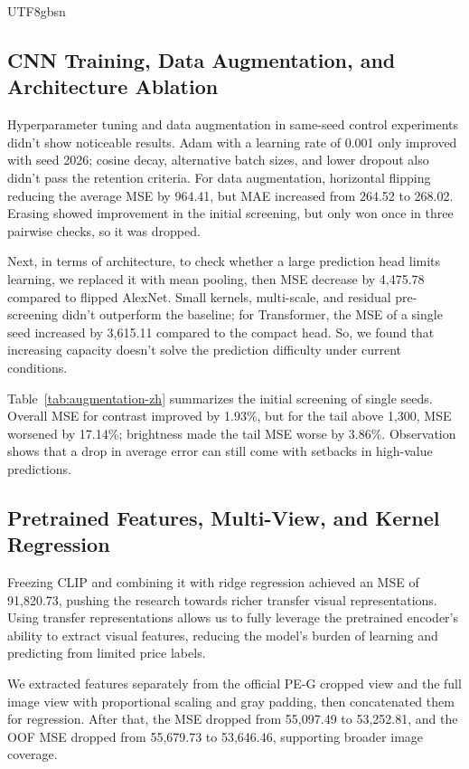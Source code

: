 \documentclass[conference,a4paper]{IEEEtran}
\begin{document}
\begin{CJK*}{UTF8}{gbsn}
\subsection{CNN Training, Data Augmentation, and Architecture Ablation}

Hyperparameter tuning and data augmentation in same-seed control experiments didn't show noticeable results. Adam with a learning rate of 0.001 only improved with seed 2026; cosine decay, alternative batch sizes, and lower dropout also didn’t pass the retention criteria. For data augmentation, horizontal flipping reducing the average MSE by 964.41, but MAE increased from 264.52 to 268.02. Erasing showed improvement in the initial screening, but only won once in three pairwise checks, so it was dropped.


Next, in terms of architecture, to check whether a large prediction head limits learning, we replaced it with mean pooling, then MSE decrease by 4,475.78 compared to flipped AlexNet. Small kernels, multi-scale, and residual pre-screening didn't outperform the baseline; for Transformer, the MSE of a single seed increased by 3,615.11 compared to the compact head. So, we found that increasing capacity doesn't solve the prediction difficulty under current conditions.

Table~\ref{tab:augmentation-zh} summarizes the initial screening of single seeds. Overall MSE for contrast improved by 1.93\%, but for the tail above 1,300, MSE worsened by 17.14\%; brightness made the tail MSE worse by 3.86\%. Observation shows that a drop in average error can still come with setbacks in high-value predictions.





\subsection{Pretrained Features, Multi-View, and Kernel Regression}
Freezing CLIP and combining it with ridge regression achieved an MSE of 91,820.73, pushing the research towards richer transfer visual representations. Using transfer representations allows us to fully leverage the pretrained encoder's ability to extract visual features, reducing the model's burden of learning and predicting from limited price labels.

We extracted features separately from the official PE-G cropped view and the full image view with proportional scaling and gray padding, then concatenated them for regression. After that, the MSE dropped from 55,097.49 to 53,252.81, and the OOF MSE dropped from 55,679.73 to 53,646.46, supporting broader image coverage.



\end{CJK*}
\end{document}
